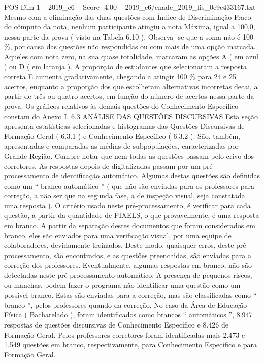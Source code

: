 \begin{textsample}{POS Dim 1 – 2019\_c6 – Score -4.00 – 2019\_c6/enade\_2019\_fis\_0e9c433167.txt}
Mesmo com a eliminação das duas questões com Índice de Discriminação Fraco do cômputo da nota, nenhum participante atingiu a nota Máxima, igual a 100,0, nessa parte da prova ( visto na Tabela 6.10 ).
Observa -se que a soma não é 100 \%, por causa das questões não respondidas ou com mais de uma opção marcada.
Aqueles com nota zero, na sua quase totalidade, marcaram as opções A ( em azul ) ou D ( em laranja ).
A proporção de estudantes que selecionaram a resposta correta E aumenta gradativamente, chegando a atingir 100 \% para 24 e 25 acertos, enquanto a proporção dos que escolheram alternativas incorretas decai, a partir de três ou quatro acertos, em função do número de acertos nessa parte da prova.
Os gráficos relativos às demais questões do Conhecimento Específico constam do Anexo I. 6.3 ANÁLISE DAS QUESTÕES DISCURSIVAS Esta seção apresenta estatísticas selecionadas e histogramas das Questões Discursivas de Formação Geral ( 6.3.1 ) e Conhecimento Específico ( 6.3.2 ).
São, também, apresentadas e comparadas as médias de subpopulações, caracterizadas por Grande Região.
Cumpre notar que nem todas as questões passam pelo crivo dos corretores.
As respostas depois de digitalizadas passam por um pré-processamento de identificação automático.
Algumas destas questões são definidas como um “ branco automático ” ( que não são enviadas para os professores para correção, a não ser que na segunda fase, a de inspeção visual, seja constatada uma resposta ).
O critério usado neste pré-processamento, é verificar para cada questão, a partir da quantidade de PIXELS, o que provavelmente, é uma resposta em branco.
A partir da separação destes documentos que foram considerados em branco, eles são enviados para uma verificação visual, por uma equipe de colaboradores, devidamente treinados.
Deste modo, quaisquer erros, deste pré-processamento, são encontrados, e as questões preenchidas, são enviadas para a correção dos professores.
Eventualmente, algumas respostas em branco, não são detectadas neste pré-processamento automático.
A presença de pequenos riscos, ou manchas, podem fazer o programa não identificar uma questão como um possível branco.
Estas são enviadas para a correção, mas são classificadas como “ branco ”, pelos professores quando da correção.
No caso da Área de Educação Física ( Bacharelado ), foram identificados como brancos “ automáticos ”, 8.947 respostas de questões discursivas de Conhecimento Específico e 8.426 de Formação Geral.
Pelos professores corretores foram identificadas mais 2.473 e 1.549 questões em branco, respectivamente, para Conhecimento Específico e para Formação Geral.

\end{textsample}
